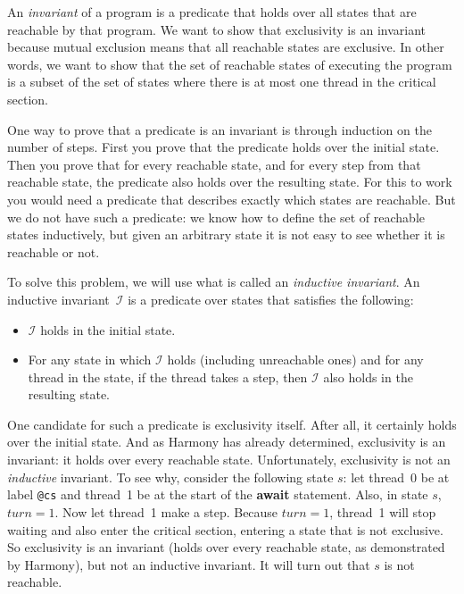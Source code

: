 \documentclass{report}
\begin{document}
An \emph{invariant} of a program
%
is a predicate that holds over all states that are reachable by that program.
We want to show that exclusivity is an invariant because mutual exclusion means
that all reachable states are exclusive.
In other words, we want to show that the set of reachable states of executing
the program
is a subset of the set of states where there is at most one thread in the critical
section.

One way to prove that a predicate is an invariant is through induction
on the number of steps.  First you prove that the predicate holds over
the initial state.  Then you prove that for every reachable state,
and for every step from that reachable state, the predicate also holds
over the resulting state.
For this to work you would need a predicate that describes exactly which
states are reachable.
But we do not have such a predicate: we know how to define the set
of reachable states inductively, but given an arbitrary state it is not
easy to see whether it is reachable or not.

To solve this problem, we will use what is called an
\emph{inductive invariant}.
%
An inductive invariant~$\mathcal{I}$ is a predicate over states that satisfies the following:
\begin{itemize}
\item $\mathcal{I}$ holds in the initial state.
\item For any state in which $\mathcal{I}$ holds (including unreachable ones) and for any
thread in the state, if the thread takes a step, then $\mathcal{I}$ also holds in the
resulting state.
\end{itemize}

One candidate for such a predicate is exclusivity itself.
After all, it certainly holds over the initial state.
And as Harmony has already determined, exclusivity is an invariant:
it holds over every reachable state.
Unfortunately, exclusivity is not an \emph{inductive} invariant.
To see why, consider the following state $s$: let thread~0 be at label \texttt{@cs}
and thread~1 be at the start of the \textbf{await} statement.
Also, in state $s$, $\mathit{turn} = 1$.  Now let
thread~1 make a step.  Because $\mathit{turn} = 1$,
thread~1 will stop waiting and also enter the critical
section, entering a state that is not exclusive.
So exclusivity is an invariant (holds over every reachable state, as demonstrated
by Harmony),
but not an inductive invariant.
It will turn out that $s$ is not reachable.
\end{document}
